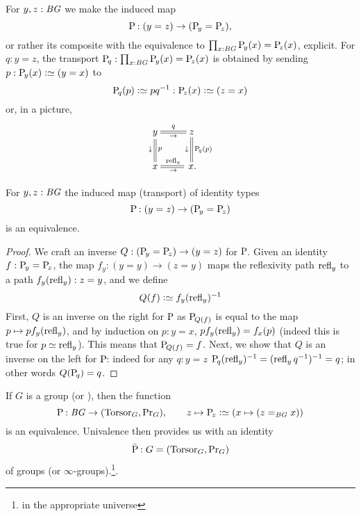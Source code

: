 \begin{example}\label{ex:pathsptransport}
  For $y,z:\mathit{B}\mathit{G}$ we make the induced map
$$\mathrm{P}_{\!}:(y=z)\to (\mathrm{P}_{\!y}=\mathrm{P}_{\!z}),
$$
or rather its composite with the equivalence to $\prod_{x:\mathit{B}\mathit{G}}\mathrm{P}_{\!y}(x)=\mathrm{P}_{\!z}(x)$,
explicit.  
For $q:y=z$,  the transport 
$\mathrm{P}_{\!q}:\prod_{x:\mathit{B}\mathit{G}}\mathrm{P}_{\!y}(x)=\mathrm{P}_{\!z}(x)$
is obtained 
by sending $p:\pathsp y(x)\defequi (y=x)$ to
$$\pathsp q(p)\defequi pq^{-1}:\pathsp z(x)\defequi(z=x)$$ 
or, in a picture, 
$$\xymatrix{y\ar@{=}[r]^q_\to\ar@{=}[d]^{p}_\downarrow&z\ar@{=}[d]^{\pathsp q(p)}_\downarrow\\
x\ar@{=}[r]^{\refl x}_\to&\,x.}$$
\end{example}
\begin{lemma}\label{lem:pathsptransportiseq}
  For  $y,z:\mathit{B}\mathit{G}$ the induced map  (\ie transport) of identity types
$$\mathrm{P}_{\!}:(y=z)\to (\mathrm{P}_{\!y}=\mathrm{P}_{\!z})$$
is an equivalence.
\end{lemma}
\begin{proof}
  We craft an inverse $Q:(\mathrm{P}_{\!y}=\mathrm{P}_{\!z}) \to (y=z)$ for
  $\mathrm{P}_{\!}$. Given an identity $f:\mathrm{P}_{\!y} = \mathrm{P}_{\!z}$, the map
  $f_y: (y=y) \to (z=y)$ maps the reflexivity path $\refl y$ to a path
  $f_y(\refl y):z=y$, and we define
  \begin{displaymath}
    Q(f) \defequi \inv{f_y(\refl y)}
  \end{displaymath}
  First, $Q$ is an inverse on the right for $\mathrm{P}_{\!}$ as
  $\mathrm{P}_{\!Q(f)}$ is equal to the map $p \mapsto p f_y(\refl y)$, and
  by induction on $p:y=x$, $p f_y(\refl y) = f_x(p)$ (indeed this is
  true for $p\jdeq \refl y$). This means that $\mathrm{P}_{\!Q(f)} =
  f$. Next, we show that $Q$ is an inverse on the left for
  $\mathrm{P}_{\!}$: indeed for any $q:y=z$
  $\inv{\pathsp{q}(\refl y)} = \inv{(\refl y \inv q)} = q$; in other
  words $Q(\mathrm{P}_{\!q})=q$.
\end{proof}


\begin{theorem}\label{lem:BGbytorsor}
  If $G$ is a group (or \inftygp), then the function
$$\pathsp{}:\BG\to(\typetorsor_G,\princ G),\qquad z\mapsto \pathsp z\defequi(x\mapsto(z=_{\BG}x))$$
is an equivalence.
Univalence then provides us with an identity 
$$\bar{\mathrm{P}_{\!}}:G=(\mathrm{Torsor}_G,\mathrm{Pr}_{{G}})$$ of groups (or $\infty$-groups).\footnote{in the appropriate universe}.
\end{theorem}

